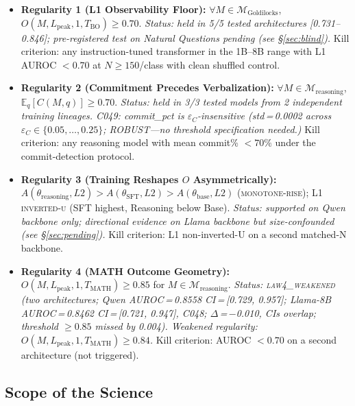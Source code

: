 \documentclass[11pt]{article}
\begin{document}
\begin{itemize}
  \item \textbf{Regularity 1 (L1 Observability Floor):} $\forall M \in \mathcal{M}_{\text{Goldilocks}}$,
    $O(M, L_{\text{peak}}, 1, T_{\text{BO}}) \geq 0.70$.
    \emph{Status: held in 5/5 tested architectures [0.731--0.846]; pre-registered
    test on Natural Questions pending (see \S\ref{sec:blind}).}
    Kill criterion: any instruction-tuned transformer in the 1B--8B range with
    L1 AUROC $< 0.70$ at $N \geq 150$/class with clean shuffled control.

  \item \textbf{Regularity 2 (Commitment Precedes Verbalization):}
    $\forall M \in \mathcal{M}_{\text{reasoning}}$, $\mathbb{E}_q[C(M,q)] \geq 0.70$.
    \emph{Status: held in 3/3 tested models from 2 independent training lineages.
    C049: commit\_pct is $\varepsilon_C$-insensitive (std\,=\,0.0002 across
    $\varepsilon_C \in \{0.05, \ldots, 0.25\}$; ROBUST---no threshold specification needed.)}
    Kill criterion: any reasoning model with mean commit\% $< 70\%$ under the
    commit-detection protocol.

  \item \textbf{Regularity 3 (Training Reshapes $O$ Asymmetrically):}
    $A(\theta_{\text{reasoning}}, L2) > A(\theta_{\text{SFT}}, L2) > A(\theta_{\text{base}}, L2)$
    (\textsc{monotone-rise}); L1 \textsc{inverted-u} (SFT highest, Reasoning below Base).
    \emph{Status: supported on Qwen backbone only; directional evidence on Llama
    backbone but size-confounded (see \S\ref{sec:pending}).}
    Kill criterion: L1 non-inverted-U on a second matched-N backbone.

  \item \textbf{Regularity 4 (MATH Outcome Geometry):}
    $O(M, L_{\text{peak}}, 1, T_{\text{MATH}}) \geq 0.85$ for $M \in \mathcal{M}_{\text{reasoning}}$.
    \emph{Status: \textsc{law4\_weakened} (two architectures; Qwen AUROC\,=\,0.8558
    CI\,=\,[0.729, 0.957]; Llama-8B AUROC\,=\,0.8462 CI\,=\,[0.721, 0.947], C048;
    $\Delta$\,=\,$-$0.010, CIs overlap; threshold $\geq 0.85$ missed by 0.004).
    Weakened regularity: $O(M, L_{\text{peak}}, 1, T_{\text{MATH}}) \geq 0.84$.}
    Kill criterion: AUROC $< 0.70$ on a second architecture (not triggered).
\end{itemize}

\subsection{Scope of the Science}
\label{sec:scope}
\end{document}
